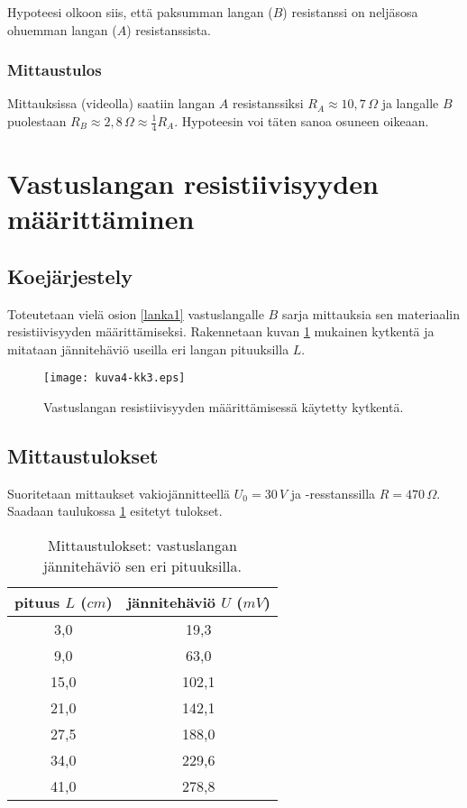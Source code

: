 \documentclass[a4paper,11pt]{article}
\begin{document}
{Hypoteesi olkoon siis, että paksumman langan ($B$) resistanssi on neljäsosa ohuemman langan ($A$) resistanssista.

\subsubsection{Mittaustulos}

Mittauksissa (videolla) saatiin langan $A$ resistanssiksi $R_A \approx 10,7\,\Omega$ ja langalle $B$ puolestaan $R_B \approx 2,8\,\Omega \approx \frac{1}{4} R_A$. Hypoteesin voi täten sanoa osuneen oikeaan.

\section{Vastuslangan resistiivisyyden määrittäminen}
\label{lanka2}

\subsection{Koejärjestely}

Toteutetaan vielä osion \ref{lanka1} vastuslangalle $B$ sarja mittauksia sen materiaalin resistiivisyyden määrittämiseksi. Rakennetaan kuvan \ref{fig:kk3} mukainen kytkentä ja mitataan jännitehäviö useilla eri langan pituuksilla $L$.

\begin{figure}[!htb]
    \centering
    \texttt{[image: kuva4-kk3.eps]}
    \caption{Vastuslangan resistiivisyyden määrittämisessä käytetty kytkentä.}
    \label{fig:kk3}
\end{figure}

\subsection{Mittaustulokset}

Suoritetaan mittaukset vakiojännitteellä $U_0=30\,V$ ja -resstanssilla $R=470\,\Omega$. Saadaan taulukossa \ref{tab:t1} esitetyt tulokset.

\begin{table}[!htb]
    \centering
    \begin{tabular}{|c|c|}
        \hline
        pituus $L$ ($cm$) & jännitehäviö $U$ ($mV$) \\
        \hline
        3,0 & 19,3\\
        9,0 & 63,0\\
        15,0 & 102,1\\
        21,0 & 142,1\\
        27,5 & 188,0\\
        34,0 & 229,6\\
        41,0 & 278,8\\
        \hline
    \end{tabular}
    \caption{Mittaustulokset: vastuslangan jännitehäviö sen eri pituuksilla.}
    \label{tab:t1}
\end{table}

}
\end{document}
